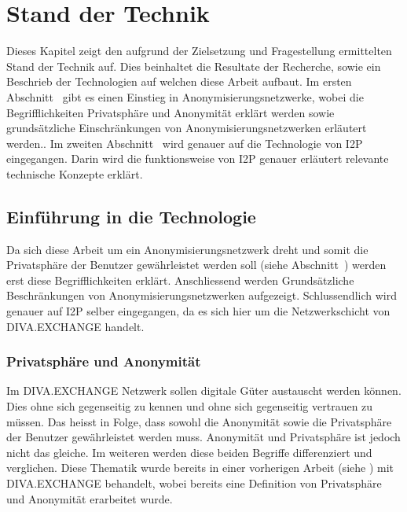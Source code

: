 \chapter{Stand der Technik}\label{ch:StandDerTechnik}


Dieses Kapitel zeigt den aufgrund der Zielsetzung und Fragestellung ermittelten Stand der Technik auf.
Dies beinhaltet die Resultate der Recherche, sowie ein Beschrieb der Technologien auf welchen diese Arbeit aufbaut.
Im ersten Abschnitt~ gibt es einen Einstieg in Anonymisierungsnetzwerke, wobei die Begrifflichkeiten Privatsphäre und Anonymität erklärt werden sowie grundsätzliche Einschränkungen von Anonymisierungsnetzwerken erläutert werden..
Im zweiten Abschnitt~ wird genauer auf die Technologie von I2P eingegangen.
Darin wird die funktionsweise von I2P genauer erläutert relevante technische Konzepte erklärt.

\section{Einführung in die Technologie}\label{sec:techintro}

Da sich diese Arbeit um ein Anonymisierungsnetzwerk dreht und somit die Privatsphäre der Benutzer gewährleistet werden soll (siehe Abschnitt~)
werden erst diese Begrifflichkeiten erklärt.
Anschliessend werden Grundsätzliche Beschränkungen von Anonymisierungsnetzwerken aufgezeigt.
Schlussendlich wird genauer auf I2P selber eingegangen, da es sich hier um die Netzwerkschicht von DIVA.EXCHANGE handelt.

\subsection{Privatsphäre und Anonymität}\label{sec:privacy_anonymity}

Im DIVA.EXCHANGE Netzwerk sollen digitale Güter austauscht werden können.
Dies ohne sich gegenseitig zu kennen und ohne sich gegenseitig vertrauen zu müssen.
Das heisst in Folge, dass sowohl die Anonymität sowie die Privatsphäre der Benutzer gewährleistet werden muss.
Anonymität und Privatsphäre ist jedoch nicht das gleiche. Im weiteren werden diese beiden Begriffe differenziert und verglichen.
Diese Thematik wurde bereits in einer vorherigen Arbeit (siehe \cite[S. 9]{maric_untersuchung_2020}) mit DIVA.EXCHANGE behandelt,
wobei bereits eine Definition von Privatsphäre und Anonymität erarbeitet wurde.


